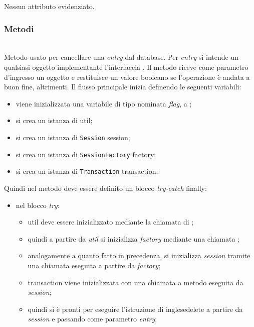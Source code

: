 Nessun attributo evidenziato.

\subsubsection*{Metodi}

\begin{description}
	\item{}\\
	Metodo usato per cancellare una \textit{entry} dal database. Per \textit{entry} si intende un qualsiasi oggetto implementante l'interfaccia . Il metodo riceve come parametro d'ingresso un oggetto  e restituisce un valore booleano  se l'operazione è andata a buon fine,  altrimenti. Il flusso principale inizia definendo le seguenti variabili:
	\begin{itemize}
		\item viene inizializzata una variabile di tipo  nominata \textit{flag}, a ;
		\item si crea un istanza di  util;
		\item si crea un istanza di \texttt{Session} session;
		\item si crea un istanza di \texttt{SessionFactory} factory;
		\item si crea un istanza di \texttt{Transaction} transaction;
	\end{itemize}
	Quindi nel metodo deve essere definito un blocco \textit{try-catch} finally:
	\begin{itemize}
		\item nel blocco \textit{try}:
		\begin{itemize}
			\item util deve essere inizializzato mediante la chiamata  di ;
			\item quindi a partire da \textit{util} si inizializza \textit{factory} mediante una chiamata ;
			\item analogamente a quanto fatto in precedenza, si inizializza \textit{session} tramite una chiamata  eseguita a partire da \textit{factory};
			\item transaction viene inizializzata con una chiamata a metodo  eseguita da \textit{session};
			\item quindi si è pronti per eseguire l'istruzione di inglese{delete} a partire da \textit{session} e passando come parametro \textit{entry};

\end{itemize}
\end{itemize}
\end{description}
